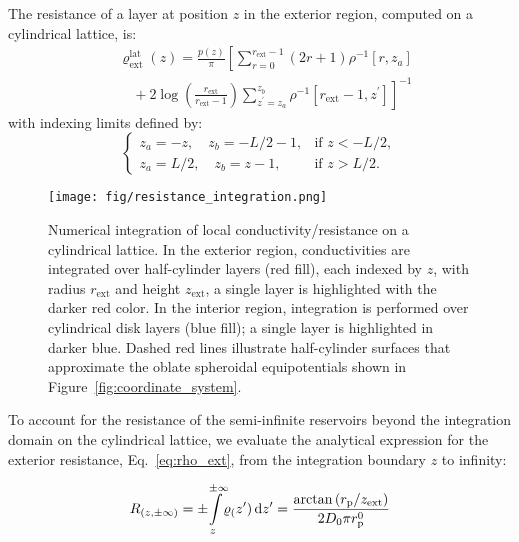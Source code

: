 \documentclass[10pt, a4paper]{article}
\begin{document}
\begin{multicols}{2}
The resistance of a layer at position $z$ in the exterior region, computed on a cylindrical lattice, is:
\begin{equation}
    \begin{aligned}
        &\varrho_{\text{ext}}^{\text{lat}}(z) = 
        \frac{p(z)}{\pi}\left[
        \sum_{r=0}^{r_{\text{ext}}-1}(2r+1)\rho^{-1}[r,z_a]\right.\\[4pt]
        &\quad+\left. 2 \log\left(\frac{r_{\text{ext}}}{r_{\text{ext}}\!-\! 1}\right)\sum_{z^{\prime}=z_{a}}^{z_{b}}\rho^{-1}[r_{\text{ext}}\!-\!1,z^{\prime}]
        \right]^{-1}
    \end{aligned}
\end{equation}
with indexing limits defined by:
\begin{equation*}
    \begin{cases}
        z_{a} = -z,\quad z_{b} = -L/2-1,&\text{if } z < -L/2,\\[4pt]
        z_{a} = L/2,\quad z_{b} = z-1,&\text{if } z > L/2.
    \end{cases}
\end{equation*}

\begin{figure}[H]
    \centering
    \texttt{[image: fig/resistance\_integration.png]}
    \caption{
        Numerical integration of local conductivity/resistance on a cylindrical lattice.
        In the exterior region, conductivities are integrated over half-cylinder layers (red fill), each indexed by $z$, with radius $r_{\text{ext}}$ and height $z_{\text{ext}}$, a single layer is highlighted with the darker red color.
        In the interior region, integration is performed over cylindrical disk layers (blue fill); a single layer is highlighted in darker blue.
        Dashed red lines illustrate half-cylinder surfaces that approximate the oblate spheroidal equipotentials shown in Figure~\ref{fig:coordinate_system}.
    }
    \label{fig:integration_scheme}
\end{figure}

To account for the resistance of the semi-infinite reservoirs beyond the integration domain on the cylindrical lattice, we evaluate the analytical expression for the exterior resistance, Eq.~\ref{eq:rho_ext}, from the integration boundary $z$ to infinity:

\begin{eqnarray}
    \label{eq:r_reservoir}
    R_{(z, \pm\infty)} = \pm\!\! \int\displaylimits_{z}^{\pm\infty}\!\! \varrho_(z') \, \text{d}z' = \frac{\arctan\left({r_{\text{p}}}/{z_{\text{ext}}} \right)}{2 D_0 \pi r_{\text{p}}^{0}}
\end{eqnarray}


\end{multicols}
\end{document}
